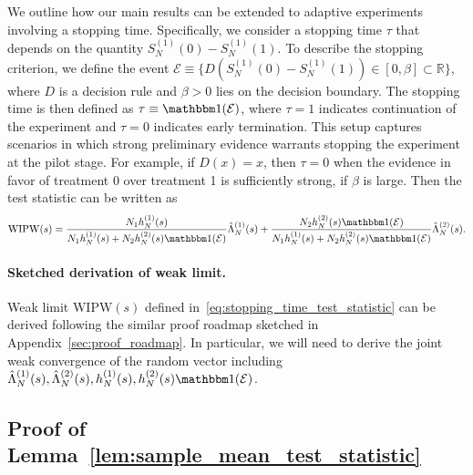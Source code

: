 \documentclass[12pt]{article}
\newcommand{\indicator}{\mathbbm 1}						%
\newcommand{\WIPW}{\mathrm{WIPW}}
\begin{document}
We outline how our main results can be extended to adaptive experiments involving a stopping time. Specifically, we consider a stopping time $\tau$ that depends on the quantity $S_N^{(1)}(0) - S_N^{(1)}(1)$. To describe the stopping criterion, we define the event $\mathcal{E} \equiv \{ D(S_N^{(1)}(0) - S_N^{(1)}(1)) \in [0,\beta] \subset \mathbb{R} \}$, where $D$ is a decision rule and $\beta >0$ lies on the decision boundary. The stopping time is then defined as $\tau \equiv \indicator(\mathcal{E})$, where $\tau = 1$ indicates continuation of the experiment and $\tau = 0$ indicates early termination. This setup captures scenarios in which strong preliminary evidence warrants stopping the experiment at the pilot stage. For example, if $D(x) = x$, then $\tau = 0$ when the evidence in favor of treatment 0 over treatment 1 is sufficiently strong, if $\beta$ is large. Then the test statistic can be written as 
\small
\begin{align}\label{eq:stopping_time_test_statistic}
	\WIPW(s)=\frac{N_1 h_{N}^{(1)}(s)}{N_1 h_{N}^{(1)}(s)+N_2 h_{N}^{(2)}(s)\indicator(\mathcal{E})} \hat{\Lambda}_{N}^{(1)}(s)+\frac{N_2 h_{N}^{(2)}(s)\indicator(\mathcal{E})}{N_1 h_{N}^{(1)}(s)+N_2 h_{N}^{(2)}(s)\indicator(\mathcal{E})} \hat{\Lambda}_{N}^{(2)}(s).
\end{align}
\normalsize

\paragraph{Sketched derivation of weak limit.}

Weak limit $\WIPW(s)$ defined in~\eqref{eq:stopping_time_test_statistic} can be derived following the similar proof roadmap sketched in Appendix~\ref{sec:proof_roadmap}. In particular, we will need to derive the joint weak convergence of the random vector including $\hat \Lambda_N^{(1)}(s),\hat \Lambda_N^{(2)}(s),h_{N}^{(1)}(s), h_{N}^{(2)}(s)\indicator(\mathcal{E})$. 


\subsection{Proof of Lemma~\ref{lem:sample_mean_test_statistic}}\label{sec:proof_sample_mean_equivalence}
\end{document}
